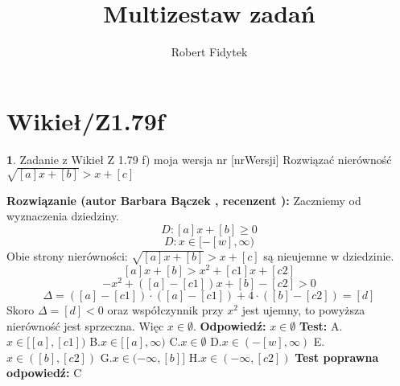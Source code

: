 \documentclass[12pt, a4paper]{article}
\title{Multizestaw zadań}
\author{Robert Fidytek}
\date{}
\theoremstyle{definition} %
\newtheorem{zad}{}
\newcommand{\kategoria}[1]{\section{#1}} %
\newcommand{\zadStart}[1]{\begin{zad}#1\newline} %
\newcommand{\zadStop}{\end{zad}}   %
\newcommand{\rozwStart}[2]{\noindent \textbf{Rozwiązanie (autor #1 , recenzent #2): }\newline} %
\newcommand{\rozwStop}{\newline}                                            %
\newcommand{\odpStart}{\noindent \textbf{Odpowiedź:}\newline}    %
\newcommand{\odpStop}{\newline}                                             %
\newcommand{\testStart}{\noindent \textbf{Test:}\newline} %
\newcommand{\testStop}{\newline} %
\newcommand{\kluczStart}{\noindent \textbf{Test poprawna odpowiedź:}\newline} %
\newcommand{\kluczStop}{\newline} %
\begin{document}
\maketitle


\kategoria{Wikieł/Z1.79f}
\zadStart{Zadanie z Wikieł Z 1.79 f) moja wersja nr [nrWersji]}
Rozwiązać nierówność $\sqrt{[a]x+[b]}>x+[c]$
\zadStop
\rozwStart{Barbara Bączek}{}
Zaczniemy od wyznaczenia dziedziny.
$$D: [a]x+[b] \geq 0$$
$$D: x \in [-[w], \infty)$$
Obie strony nierówności: $\sqrt{[a]x+[b]}>x+[c]$ są nieujemne w dziedzinie.
$$[a]x+[b]>x^2+ [c1]x + [c2]$$
$$-x^2 + ([a]-[c1])x +[b]-[c2]>0$$
$$\Delta=([a]-[c1])\cdot([a]-[c1])+4\cdot([b]-[c2])=[d]$$
Skoro $\Delta= [d]<0$ oraz współczynnik przy $x^2$ jest ujemny, to powyższa nierówność jest sprzeczna. Więc $x \in \emptyset$. 
\rozwStop
\odpStart
$x \in \emptyset$
\odpStop
\testStart
A.$x \in [[a],[c1])$
B.$x \in [[a],\infty)$
C.$x \in \emptyset$
D.$x \in (-[w],\infty)$
E.$x \in  ([b],[c2])$
G.$x \in (-\infty,[b]]$
H.$x \in (-\infty,[c2])$
\testStop
\kluczStart
C
\kluczStop
\end{document}

